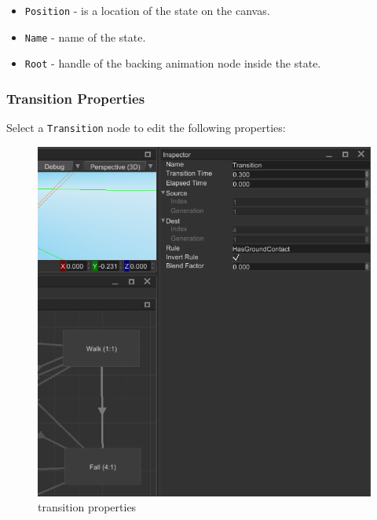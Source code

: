 \documentclass[
]{book}
\providecommand{\tightlist}{%
  \setlength{\itemsep}{0pt}\setlength{\parskip}{0pt}}
\theoremstyle{definition}
\theoremstyle{definition}
\theoremstyle{definition}
\theoremstyle{definition}
\theoremstyle{remark}
\begin{document}
\begin{itemize}
\tightlist
\item
  \texttt{Position} - is a location of the state on the canvas.
\item
  \texttt{Name} - name of the state.
\item
  \texttt{Root} - handle of the backing animation node inside the state.
\end{itemize}

\subsubsection{Transition Properties}\label{transition-properties}

Select a \texttt{Transition} node to edit the following properties:

\begin{figure}
\centering
\includegraphics{images/animation/absm_transition_properties.png}
\caption{transition properties}
\end{figure}
\end{document}
